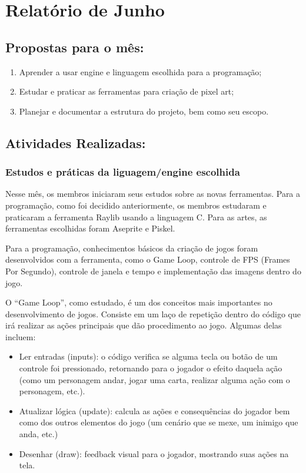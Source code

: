 \newpage
\section {Relatório de Junho}

\subsection{Propostas para o mês:}
\begin{enumerate}
    \item Aprender a usar engine e linguagem escolhida para a programação; 
    \item Estudar e praticar as ferramentas para criação de pixel art;
    \item Planejar e documentar a estrutura do projeto, bem como seu escopo. 
\end{enumerate}

\subsection{Atividades Realizadas:}

\subsubsection{Estudos e práticas da liguagem/engine escolhida}
Nesse mês, os membros iniciaram seus estudos sobre as novas ferramentas. Para a programação, como foi decidido anteriormente, os membros estudaram e praticaram a ferramenta Raylib usando a linguagem C. Para as artes, as ferramentas escolhidas foram Aseprite e Piskel.

Para a programação, conhecimentos básicos da criação de jogos foram desenvolvidos com a ferramenta, como o Game Loop, controle de FPS (Frames Por Segundo), controle de janela e tempo e implementação das imagens dentro do jogo.

O “Game Loop”, como estudado, é um dos conceitos mais importantes no desenvolvimento de jogos. Consiste em um laço de repetição dentro do código que irá realizar as ações principais que dão procedimento ao jogo. Algumas delas incluem: 

\begin{itemize}
    \item Ler entradas (inputs): o código verifica se alguma tecla ou botão de um controle foi pressionado, retornando para o jogador o efeito daquela ação (como um personagem andar, jogar uma carta, realizar alguma ação com o personagem, etc.).
    \item Atualizar lógica (update): calcula as ações e consequências do jogador bem como dos outros elementos do jogo (um cenário que se mexe, um inimigo que anda, etc.)
    \item Desenhar (draw):  feedback visual para o jogador, mostrando suas ações na tela.
\end{itemize}

